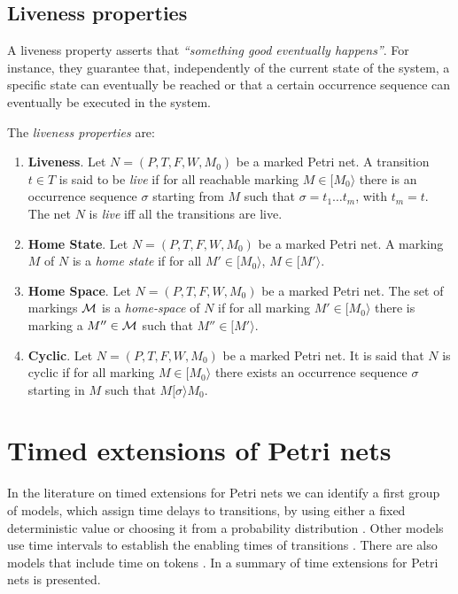 
\subsection{Liveness properties}
A liveness property asserts that \emph{``something good eventually happens''}.
For instance, they guarantee that, independently of the current state of the system,
a specific state can eventually be reached or that a certain occurrence sequence can eventually
be executed in the system.

The \emph{liveness properties} are:
\begin{enumerate}
\item {\bf Liveness}.
Let $N=(P,T,F,W,M_0)$ be a marked Petri net. A transition $t \in T$
is said to be {\it live} if for all reachable marking $M \in
[ M_0 \rangle$ there is an occurrence sequence $\sigma$ starting from $M$ such that
$\sigma = t_1 \ldots t_m$, with $t_m = t$. The net $N$ is {\it live} iff all the transitions are live.
\item {\bf Home State}.
Let $N=(P,T,F,W,M_0)$ be a marked Petri net. A marking $M$ of $N$ is a {\it home state} if for all
$M' \in [ M_0 \rangle$, $M \in [ M' \rangle$.
\item {\bf Home Space}. Let $N=(P,T,F,W,M_0)$ be a marked Petri net.
The set of markings ${\cal M}$ is a {\it home-space}
of $N$ if for all marking $M' \in [ M_0 \rangle$ there is marking
a $M'' \in {\cal M}$ such that $M'' \in [ M' \rangle$.
\item {\bf Cyclic}.
Let $N=(P,T,F,W,M_0)$ be a marked Petri net. It is said that
$N$ is cyclic if for all marking $M \in [ M_0 \rangle$ there exists an occurrence sequence $\sigma$
starting in $M$ such that $M [ \sigma \rangle M_0$.
\end{enumerate}





\section{Timed extensions of Petri nets}

In the
literature on timed extensions for Petri nets we can identify a
first group of models, which assign time delays to transitions,
by using either a fixed deterministic value
\cite{Ram74,Sif77,VFC93} or choosing it from a probability
distribution \cite{AjCh85}. Other models use time intervals to
establish the enabling times of transitions \cite{Mer74}. 
There are also models that include time on tokens
\cite{van93,van95,BLT90}. In \cite{Bow96,Wan98} 
a summary of time extensions for Petri nets is presented.




